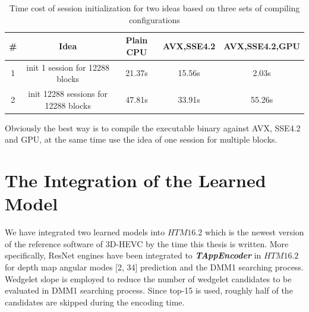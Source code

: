 \begin{table}
    \caption{Time cost of session initialization for two ideas based on three sets of compiling configurations}
    \bigskip\label{tab:seesion-init-plain-cpu}
    \centering
    \begin{tabular}{c c c c c}
        \toprule
        \# & Idea & Plain CPU & AVX,SSE4.2 & AVX,SSE4.2,GPU \\
        \midrule
        1 & init 1 session for 12288 blocks & 21.37s &15.56s&2.03s \\
        2 & init 12288 sessions for 12288 blocks & 47.81s &33.91s&55.26s\\
        \bottomrule
    \end{tabular}
\end{table}

Obviously the best way is to compile the 
executable binary against AVX, SSE4.2 and GPU, at the same
time use the idea of one session for multiple blocks.

\section{The Integration of the Learned Model}\label{sec:integration-of-learned-model}
We have integrated two learned models into 
\(HTM16.2\) which is the newest version of
the reference software of 3D-HEVC by the time this thesis
is written\@.
More specifically, ResNet engines have been integrated to 
\textbf{\textit{TAppEncoder}} in \(HTM16.2\) for depth map 
angular modes [2, 34] prediction and the DMM1 searching process.
Wedgelet slope is employed
to reduce the number of wedgelet candidates to be evaluated in DMM1 
searching process. 
Since top-15 is used, roughly half of the candidates are skipped
during the encoding time.

